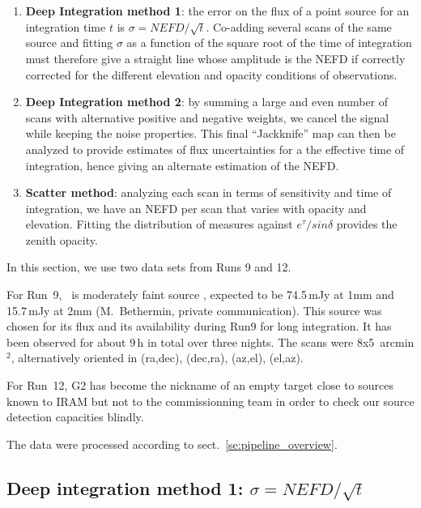 \begin{enumerate}
\item {\bf Deep Integration method 1}: the error on the flux of a point source for an
  integration time $t$ is $\sigma = NEFD/\sqrt{t}$. Co-adding several scans of
  the same source and fitting $\sigma$ as a function of the square root of the
  time of integration must therefore give a straight line whose
  amplitude is the NEFD if correctly corrected for the different elevation and
  opacity conditions of observations.
\item {\bf Deep Integration method 2}: by summing a large and even number of scans
  with alternative positive and negative weights, we cancel the signal while
  keeping the noise properties. This final ``Jackknife'' map can then be analyzed
  to provide estimates of flux uncertainties for a the effective time of
  integration, hence giving an alternate estimation of the NEFD.
\item {\bf Scatter method}: analyzing each scan in terms of sensitivity and
  time of integration, we have an NEFD per scan that varies with opacity and
  elevation. Fitting the distribution of measures against $e^\tau/sin\delta$
  provides the zenith opacity.
\end{enumerate}

In this section, we use two data sets from Runs 9 and 12.

For Run~9, \hls\ is moderately faint source \cite{hls_combes}, expected to be
74.5\,mJy at 1mm and 15.7\,mJy at 2mm (M.~Bethermin, private
communication). This source was chosen for its flux and its availability during
Run9 for long integration. It has been observed for about 9\,h in total over
three nights. The scans were 8x5~arcmin$^2$, alternatively oriented in (ra,dec),
(dec,ra), (az,el), (el,az).

For Run~12, G2 has become the nickname of an empty target close to sources known
to IRAM but not to the commissionning team in order to check our source
detection capacities blindly.

The data were processed according to sect.~\ref{se:pipeline_overview}.

\subsection{Deep integration method 1: $\sigma = NEFD/\sqrt{t}$}



